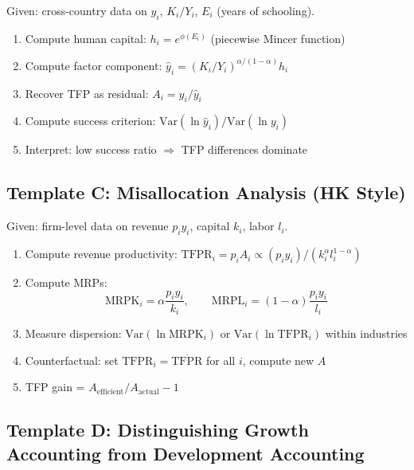 \documentclass[a4paper,11pt]{article}
\newcommand{\MRPK}{\mathrm{MRPK}}
\newcommand{\MRPL}{\mathrm{MRPL}}
\newcommand{\TFPR}{\mathrm{TFPR}}
\begin{document}
Given: cross-country data on $y_i$, $K_i/Y_i$, $E_i$ (years of schooling).

\begin{enumerate}
    \item Compute human capital: $h_i = e^{\phi(E_i)}$ (piecewise Mincer function)
    \item Compute factor component: $\hat{y}_i = (K_i/Y_i)^{\alpha/(1-\alpha)} h_i$
    \item Recover TFP as residual: $A_i = y_i / \hat{y}_i$
    \item Compute success criterion: $\mathrm{Var}(\ln \hat{y}_i) / \mathrm{Var}(\ln y_i)$
    \item Interpret: low success ratio $\Rightarrow$ TFP differences dominate
\end{enumerate}

\subsection*{Template C: Misallocation Analysis (HK Style)}

Given: firm-level data on revenue $p_i y_i$, capital $k_i$, labor $l_i$.

\begin{enumerate}
    \item Compute revenue productivity: $\TFPR_i = p_i A_i \propto (p_i y_i) / (k_i^\alpha l_i^{1-\alpha})$
    \item Compute MRPs:
    \[
    \MRPK_i = \alpha \frac{p_i y_i}{k_i}, \qquad \MRPL_i = (1-\alpha)\frac{p_i y_i}{l_i}
    \]
    \item Measure dispersion: $\mathrm{Var}(\ln \MRPK_i)$ or $\mathrm{Var}(\ln \TFPR_i)$ within industries
    \item Counterfactual: set $\TFPR_i = \overline{\TFPR}$ for all $i$, compute new $A$
    \item TFP gain = $A_{\text{efficient}} / A_{\text{actual}} - 1$
\end{enumerate}

\subsection*{Template D: Distinguishing Growth Accounting from Development Accounting}
\end{document}
